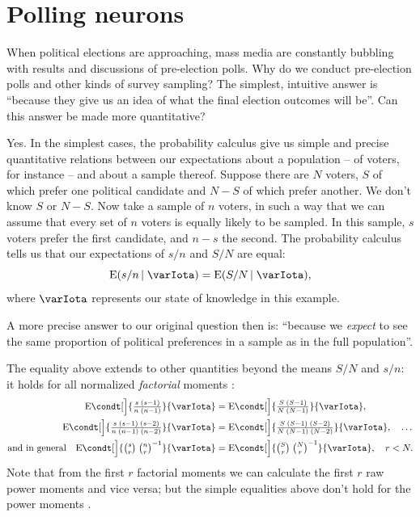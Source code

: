 \documentclass[\ifafour a4paper,12pt,\else a5paper,10pt,\fi%
onecolumn,oneside,article,%
british%
]{memoir}
\theoremstyle{remark}
\theoremstyle{innote}
\newcommand*{\citep}{\parencites}
\newcommand*{\E}{\mathrm{E}}
\renewcommand*{\|}{\nonscript\,\vert\nonscript\;\mathopen{}}
\newcommand*{\sect}{\S}%
\newcommand*{\yH}{\varIota}
\begin{document}

\section{Polling neurons}
\label{sec:polls}

When political elections are approaching, mass media are constantly
bubbling with results and discussions of pre-election polls. Why do we
conduct pre-election polls and other kinds of survey sampling? The
simplest, intuitive answer is \enquote{because they give us an idea of what
  the final election outcomes will be}. Can this answer be made more
quantitative?

Yes. In the simplest cases, the probability calculus give us simple and
precise quantitative relations between our expectations about a population
-- of voters, for instance -- and about a sample thereof. Suppose there are
$N$ voters, $S$ of which prefer one political candidate and $N-S$ of which
prefer another. We don't know $S$ or $N-S$. Now take a sample of $n$
voters, in such a way that we can assume that every set of $n$ voters is
equally likely to be sampled. In this sample, $s$ voters prefer the first
candidate, and $n-s$ the second. The probability calculus tells us that our
expectations of $s/n$ and $S/N$ are equal:
\begin{equation}
  \label{eq:equal_expectations_poll}
  \E(s/n \| \yH) = \E(S/N \| \yH),
\end{equation}
where $\yH$ represents our state of knowledge in this example.

A more precise answer to our original question then is: \enquote{because we
  \emph{expect} to see the same proportion of political preferences in a
  sample as in the full population}.

The equality above extends to other quantities beyond the means $S/N$ and
$s/n$: it holds for all normalized \emph{factorial} moments
\citep{potts1953,broca2005}:
\begin{equation}
  \label{eq:equal_factorialmoments_polls}
  \begin{split}
  \E\condt[\Big]{\tfrac{s\;(s-1)}{n\;(n-1)}}{\yH} &= 
  \E\condt[\Big]{\tfrac{S\;(S-1)}{N\;(N-1)}}{\yH},\\
  \E\condt[\Big]{\tfrac{s\;(s-1)\;(s-2)}{n\;(n-1)\;(n-2)}}{\yH} &= 
  \E\condt[\Big]{\tfrac{S\;(S-1)\;(S-2)}{N\;(N-1)\;(N-2)}}{\yH},\quad\dotsc
  \\
  \text{and in general}\quad
  \E\condt[\Big]{\tbinom{s}{r}\;\tbinom{n}{r}^{-1}}{\yH} &=
  \E\condt[\Big]{\tbinom{S}{r}\;\tbinom{N}{r}^{-1}}{\yH},
  \quad r<N.
\end{split}
\end{equation}
Note that from the first $r$ factorial moments we can calculate the first
$r$ raw power moments and vice versa; but the simple equalities above don't
hold for the power moments \citep[\sect~A]{portamanaetal2015}.
\end{document}
